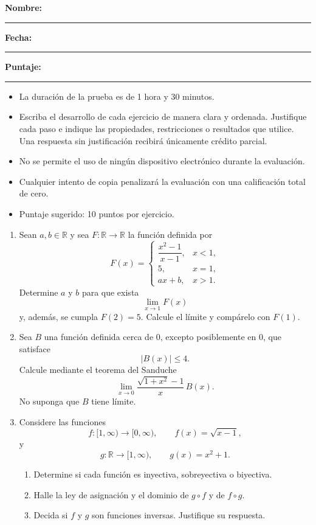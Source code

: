 \documentclass[10pt,a5paper]{article}
\begin{document}

\noindent
\textbf{Nombre:} \rule{7cm}{0.4pt}

\medskip
\noindent
\textbf{Fecha:} \rule{3cm}{0.4pt}
\hfill
\textbf{Puntaje:} \rule{1.5cm}{0.4pt}

\begin{nota}[indicaciones]
\begin{itemize}
  \item La duración de la prueba es de 1 hora y 30 minutos.
  \item Escriba el desarrollo de cada ejercicio de manera clara y ordenada.
  Justifique cada paso e indique las propiedades, restricciones o resultados que
  utilice. Una respuesta sin justificación recibirá únicamente crédito parcial.
  \item No se permite el uso de ningún dispositivo electrónico durante la
  evaluación.
  \item Cualquier intento de copia penalizará la evaluación con una calificación
  total de cero.
  \item Puntaje sugerido: 10 puntos por ejercicio.
\end{itemize}
\end{nota}

\begin{ejercicios}
\begin{enumerate}
  \item Sean $a,b\in\mathbb{R}$ y sea $F\colon\mathbb{R}\to\mathbb{R}$ la función definida por
  \[
    F(x)=
    \begin{cases}
      \dfrac{x^2-1}{x-1}, & x<1,\\[2mm]
      5, & x=1,\\
      ax+b, & x>1.
    \end{cases}
  \]
  Determine $a$ y $b$ para que exista
  \[
    \lim_{x\to1}F(x)
  \]
  y, además, se cumpla $F(2)=5$. Calcule el límite y compárelo con $F(1)$.

  \item Sea $B$ una función definida cerca de $0$, excepto posiblemente en $0$, que satisface
  \[
    |B(x)|\leq4.
  \]
  Calcule mediante el teorema del Sanduche
  \[
    \lim_{x\to0}
    \frac{\sqrt{1+x^2}-1}{x}\,B(x).
  \]
  No suponga que $B$ tiene límite.

  \item Considere las funciones
  \[
    f\colon[1,\infty)\to[0,\infty),
    \qquad
    f(x)=\sqrt{x-1},
  \]
  y
  \[
    g\colon\mathbb{R}\to[1,\infty),
    \qquad
    g(x)=x^2+1.
  \]
  \begin{enumerate}
    \item Determine si cada función es inyectiva, sobreyectiva o biyectiva.
    \item Halle la ley de asignación y el dominio de $g\circ f$ y de $f\circ g$.
    \item Decida si $f$ y $g$ son funciones inversas. Justifique su respuesta.
  \end{enumerate}
\end{enumerate}
\end{ejercicios}
\end{document}
